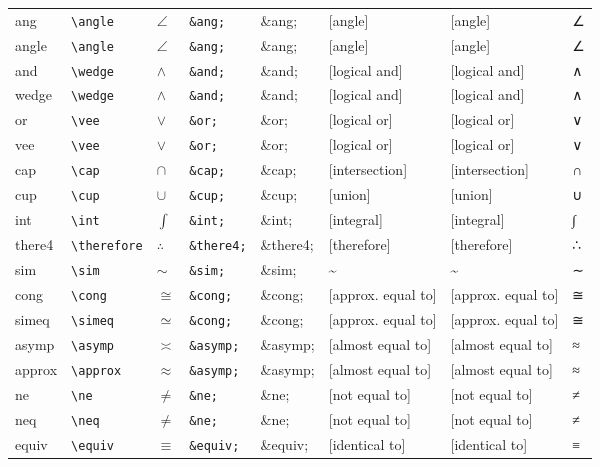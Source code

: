 \documentclass[11pt]{article}
\begin{document}
\begin{longtable}{llllllll}
ang & \texttt{\textbackslash{}angle} & $\angle$ & \texttt{\&ang;} & \&ang; & [angle] & [angle] & ∠\\
angle & \texttt{\textbackslash{}angle} & $\angle$ & \texttt{\&ang;} & \&ang; & [angle] & [angle] & ∠\\
and & \texttt{\textbackslash{}wedge} & $\wedge$ & \texttt{\&and;} & \&and; & [logical and] & [logical and] & ∧\\
wedge & \texttt{\textbackslash{}wedge} & $\wedge$ & \texttt{\&and;} & \&and; & [logical and] & [logical and] & ∧\\
or & \texttt{\textbackslash{}vee} & $\vee$ & \texttt{\&or;} & \&or; & [logical or] & [logical or] & ∨\\
vee & \texttt{\textbackslash{}vee} & $\vee$ & \texttt{\&or;} & \&or; & [logical or] & [logical or] & ∨\\
cap & \texttt{\textbackslash{}cap} & $\cap$ & \texttt{\&cap;} & \&cap; & [intersection] & [intersection] & ∩\\
cup & \texttt{\textbackslash{}cup} & $\cup$ & \texttt{\&cup;} & \&cup; & [union] & [union] & ∪\\
int & \texttt{\textbackslash{}int} & $\int$ & \texttt{\&int;} & \&int; & [integral] & [integral] & ∫\\
there4 & \texttt{\textbackslash{}therefore} & $\therefore$ & \texttt{\&there4;} & \&there4; & [therefore] & [therefore] & ∴\\
sim & \texttt{\textbackslash{}sim} & $\sim$ & \texttt{\&sim;} & \&sim; & \textasciitilde{} & \textasciitilde{} & ∼\\
cong & \texttt{\textbackslash{}cong} & $\cong$ & \texttt{\&cong;} & \&cong; & [approx. equal to] & [approx. equal to] & ≅\\
simeq & \texttt{\textbackslash{}simeq} & $\simeq$ & \texttt{\&cong;} & \&cong; & [approx. equal to] & [approx. equal to] & ≅\\
asymp & \texttt{\textbackslash{}asymp} & $\asymp$ & \texttt{\&asymp;} & \&asymp; & [almost equal to] & [almost equal to] & ≈\\
approx & \texttt{\textbackslash{}approx} & $\approx$ & \texttt{\&asymp;} & \&asymp; & [almost equal to] & [almost equal to] & ≈\\
ne & \texttt{\textbackslash{}ne} & $\ne$ & \texttt{\&ne;} & \&ne; & [not equal to] & [not equal to] & ≠\\
neq & \texttt{\textbackslash{}neq} & $\neq$ & \texttt{\&ne;} & \&ne; & [not equal to] & [not equal to] & ≠\\
equiv & \texttt{\textbackslash{}equiv} & $\equiv$ & \texttt{\&equiv;} & \&equiv; & [identical to] & [identical to] & ≡\\

\end{longtable}
\end{document}
